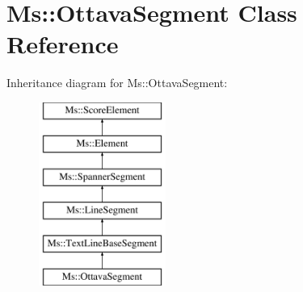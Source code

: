 \hypertarget{class_ms_1_1_ottava_segment}{}\section{Ms\+:\+:Ottava\+Segment Class Reference}
\label{class_ms_1_1_ottava_segment}
Inheritance diagram for Ms\+:\+:Ottava\+Segment\+:\begin{figure}[H]
\begin{center}
\leavevmode
\includegraphics[height=6.000000cm]{class_ms_1_1_ottava_segment}
\end{center}
\end{figure}
